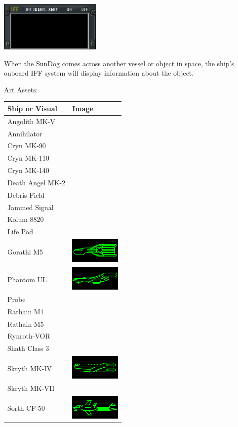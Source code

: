 \includegraphics[scale=0.70]{images/iff.png}

When the SunDog comes across another vessel or object in space, the ship's
onboard IFF system will display information about the object.  

Art Assets:

\begin{tabular}{ | l | l | }
\hline
Ship or Visual & Image \\
\hline
Angolith MK-V & \\
Annihilator & \\
Cryn MK-90 & \\
Cryn MK-110 & \\
Cryn MK-140 & \\
Death Angel MK-2 & \\
Debris Field & \\
Jammed Signal & \\
Kolum 8820 & \\
Life Pod & \\
Gorathi M5 & \includegraphics[scale=0.75]{images/ship_gorathi_m5.png} \\
Phantom UL & \includegraphics[scale=0.75]{images/ship_Phantom_UL.png} \\
Probe & \\
Rathain M1 & \\
Rathain M5 & \\
Rynroth-VOR & \\
Shath Class 3 & \\
Skryth MK-IV & \includegraphics[scale=0.75]{images/ship_skryth_mk-iv.png} \\
Skryth MK-VII & \\
Sorth CF-50 & \includegraphics[scale=0.75]{images/ship_sorth_cf-50.png} \\

\end{tabular}
